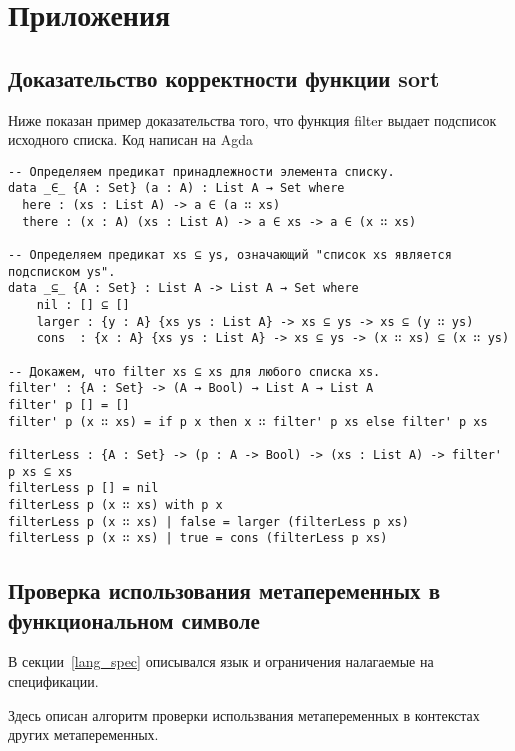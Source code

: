 \appendix
\section*{Приложения}
\renewcommand{\thesubsection}{\Alph{subsection}}

\subsection{Доказательство корректности функции sort}\label{sort_proof}

Ниже показан пример доказательства того, что функция filter выдает подсписок исходного списка.
Код написан на Agda\cite{agda}

\begin{lstlisting}
-- Определяем предикат принадлежности элемента списку.
data _∈_ {A : Set} (a : A) : List A → Set where
  here : (xs : List A) -> a ∈ (a ∷ xs)
  there : (x : A) (xs : List A) -> a ∈ xs -> a ∈ (x ∷ xs)

-- Определяем предикат xs ⊆ ys, означающий "список xs является подсписком ys".
data _⊆_ {A : Set} : List A -> List A → Set where
    nil : [] ⊆ []
    larger : {y : A} {xs ys : List A} -> xs ⊆ ys -> xs ⊆ (y ∷ ys)
    cons  : {x : A} {xs ys : List A} -> xs ⊆ ys -> (x ∷ xs) ⊆ (x ∷ ys)

-- Докажем, что filter xs ⊆ xs для любого списка xs.
filter' : {A : Set} -> (A → Bool) → List A → List A
filter' p [] = []
filter' p (x ∷ xs) = if p x then x ∷ filter' p xs else filter' p xs

filterLess : {A : Set} -> (p : A -> Bool) -> (xs : List A) -> filter' p xs ⊆ xs
filterLess p [] = nil
filterLess p (x ∷ xs) with p x
filterLess p (x ∷ xs) | false = larger (filterLess p xs)
filterLess p (x ∷ xs) | true = cons (filterLess p xs)

\end{lstlisting}

\subsection{Проверка использования метапеременных в функциональном символе}\label{toposort}
В секции~\ref{lang_spec} описывался язык и ограничения налагаемые на спецификации.

Здесь описан алгоритм проверки использвания метапеременных в контекстах других метапеременных.

